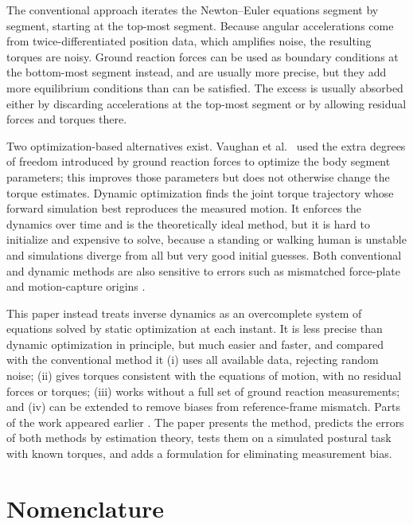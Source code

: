 \documentclass[11pt]{article}
\begin{document}
The conventional approach \cite{Winter1990} iterates the Newton--Euler
equations segment by segment, starting at the top-most segment. Because
angular accelerations come from twice-differentiated position data, which
amplifies noise, the resulting torques are noisy. Ground reaction forces can
be used as boundary conditions at the bottom-most segment instead, and are
usually more precise, but they add more equilibrium conditions than can be
satisfied. The excess is usually absorbed either by discarding accelerations
at the top-most segment or by allowing residual forces and torques there.

Two optimization-based alternatives exist. Vaughan et al.\
\cite{VaughanEtAl1982} used the extra degrees of freedom introduced by ground
reaction forces to optimize the body segment parameters; this improves those
parameters but does not otherwise change the torque estimates. Dynamic
optimization \cite{ChaoRim1973} finds the joint torque trajectory whose
forward simulation best reproduces the measured motion. It enforces the
dynamics over time and is the theoretically ideal method, but it is hard to
initialize and expensive to solve, because a standing or walking human is
unstable and simulations diverge from all but very good initial guesses.
Both conventional and dynamic methods are also sensitive to errors such as
mismatched force-plate and motion-capture origins \cite{McCawDeVita1995}.

This paper instead treats inverse dynamics as an overcomplete system of
equations solved by static optimization at each instant. It is less precise
than dynamic optimization in principle, but much easier and faster, and
compared with the conventional method it (i) uses all available data,
rejecting random noise; (ii) gives torques consistent with the equations of
motion, with no residual forces or torques; (iii) works without a full set of
ground reaction measurements; and (iv) can be extended to remove biases from
reference-frame mismatch. Parts of the work appeared earlier
\cite{Kuo1994,Kuo1995}. The paper presents the method, predicts the errors of
both methods by estimation theory, tests them on a simulated postural task
with known torques, and adds a formulation for eliminating measurement bias.

\section*{Nomenclature}
\end{document}
